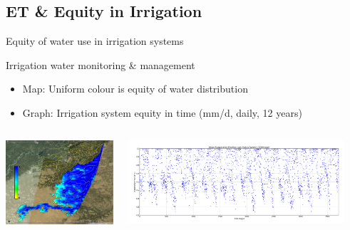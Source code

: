\documentclass[xcolor=dvipsnames,beamer]{beamer} %
\begin{document}
\subsection{ET \& Equity in Irrigation}
\begin{frame}[fragile]{Equity of water use in irrigation systems}

Irrigation water monitoring \& management
\begin{itemize}
 \item Map: Uniform colour is equity of water distribution
 \item Graph: Irrigation system equity in time (mm/d, daily, 12 years)
\end{itemize}

\begin{columns}[l]
\begin{center}
\includegraphics[width=4cm]{fess2012ef}
\end{center}

\begin{flushright}
  \includegraphics[width=8cm]{fess2012meaneftemporal}
\end{flushright}
\end{columns}
\end{frame}
\end{document}
